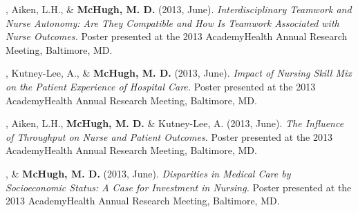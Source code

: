 \documentclass[10pt,]{article}
\begin{document}
{{{{{{{{{{{{{{\vspace{4mm}

\begin{hangparas}{.25in}{1}

, Aiken, L.H., \& {\textbf {McHugh, M. D.}} (2013, June). {\textit {Interdisciplinary Teamwork and Nurse Autonomy: Are They Compatible and How Is Teamwork Associated with Nurse Outcomes.}} Poster presented at the 2013 AcademyHealth Annual Research Meeting, Baltimore, MD.

\end{hangparas}

\vspace{4mm}

\begin{hangparas}{.25in}{1}

, Kutney-Lee, A., \& {\textbf {McHugh, M. D.}} (2013, June). {\textit {Impact of Nursing Skill Mix on the Patient Experience of Hospital Care.}} Poster presented at the 2013 AcademyHealth Annual Research Meeting, Baltimore, MD.

\end{hangparas}

\vspace{4mm}

\begin{hangparas}{.25in}{1}

, Aiken, L.H., {\textbf {McHugh, M. D.}} \& Kutney-Lee, A. (2013, June). {\textit {The Influence of Throughput on Nurse and Patient Outcomes.}} Poster presented at the 2013 AcademyHealth Annual Research Meeting, Baltimore, MD.

\end{hangparas}

\vspace{4mm}

\begin{hangparas}{.25in}{1}

, \& {\textbf {McHugh, M. D.}} (2013, June). {\textit {Disparities in Medical Care by Socioeconomic Status: A Case for Investment in Nursing.}} Poster presented at the 2013 AcademyHealth Annual Research Meeting, Baltimore, MD.

\end{hangparas}

\vspace{4mm}

\begin{hangparas}{.25in}{1}


\end{hangparas}}}}}}}}}}}}}}}
\end{document}
